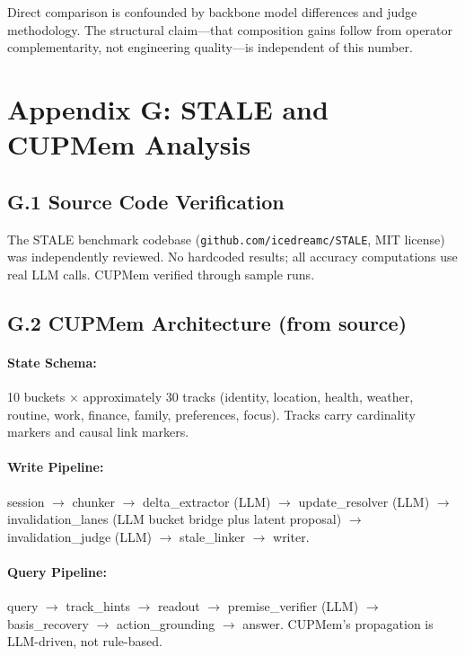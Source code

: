\documentclass[letterpaper,twocolumn,10pt]{article}
\begin{document}
Direct comparison is confounded by backbone model differences and judge methodology. The structural claim---that composition gains follow from operator complementarity, not engineering quality---is independent of this number.%

\section*{Appendix G: STALE and CUPMem Analysis}

\subsection*{G.1 Source Code Verification}%
The STALE benchmark codebase (\texttt{github.com/icedreamc/STALE}, MIT license) was independently reviewed. No hardcoded results; all accuracy computations use real LLM calls. CUPMem verified through sample runs.%

\subsection*{G.2 CUPMem Architecture (from source)}%
\paragraph{State Schema:} 10 buckets $\times$ approximately 30 tracks (identity, location, health, weather, routine, work, finance, family, preferences, focus). Tracks carry cardinality markers and causal link markers.%

\paragraph{Write Pipeline:} session $\rightarrow$ chunker $\rightarrow$ delta\_extractor (LLM) $\rightarrow$ update\_resolver (LLM) $\rightarrow$ invalidation\_lanes (LLM bucket bridge plus latent proposal) $\rightarrow$ invalidation\_judge (LLM) $\rightarrow$ stale\_linker $\rightarrow$ writer.%

\paragraph{Query Pipeline:} query $\rightarrow$ track\_hints $\rightarrow$ readout $\rightarrow$ premise\_verifier (LLM) $\rightarrow$ basis\_recovery $\rightarrow$ action\_grounding $\rightarrow$ answer. CUPMem's propagation is LLM-driven, not rule-based.%
\end{document}
